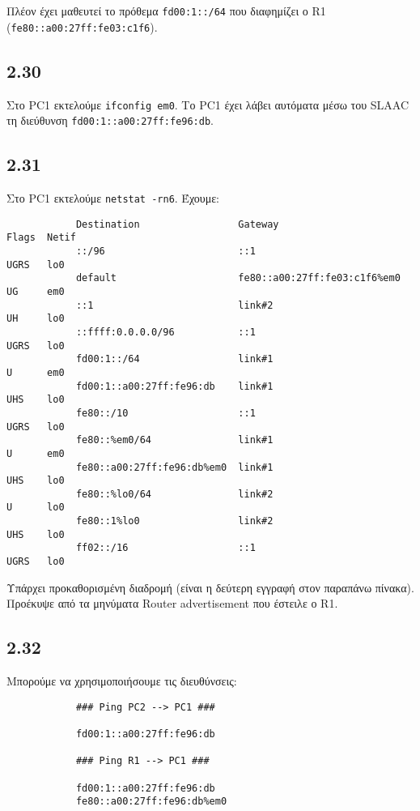 \documentclass[a4paper, 12pt]{article}
\begin{document}
		Πλέον έχει μαθευτεί το πρόθεμα \verb|fd00:1::/64| που διαφημίζει ο R1 (\verb|fe80::a00:27ff:fe03:c1f6|).

	\subsection*{2.30}
		Στο PC1 εκτελούμε \verb|ifconfig em0|. Το PC1 έχει λάβει αυτόματα μέσω του SLAAC τη διεύθυνση \verb|fd00:1::a00:27ff:fe96:db|. 

	\subsection*{2.31}
		Στο PC1 εκτελούμε \verb|netstat -rn6|. Έχουμε:
		
		\begin{verbatim}
			Destination                 Gateway                       Flags  Netif
			::/96                       ::1                           UGRS   lo0
			default                     fe80::a00:27ff:fe03:c1f6%em0  UG     em0
			::1                         link#2                        UH     lo0
			::ffff:0.0.0.0/96           ::1                           UGRS   lo0
			fd00:1::/64                 link#1                        U      em0
			fd00:1::a00:27ff:fe96:db    link#1                        UHS    lo0
			fe80::/10                   ::1                           UGRS   lo0
			fe80::%em0/64               link#1                        U      em0
			fe80::a00:27ff:fe96:db%em0  link#1                        UHS    lo0
			fe80::%lo0/64               link#2                        U      lo0
			fe80::1%lo0                 link#2                        UHS    lo0
			ff02::/16                   ::1                           UGRS   lo0
		\end{verbatim}
		
		Υπάρχει προκαθορισμένη διαδρομή (είναι η δεύτερη εγγραφή στον παραπάνω πίνακα). Προέκυψε από τα μηνύματα Router advertisement που έστειλε ο R1.

	\subsection*{2.32}
		Μπορούμε να χρησιμοποιήσουμε τις διευθύνσεις:
		
		\begin{verbatim}
			### Ping PC2 --> PC1 ###
			
			fd00:1::a00:27ff:fe96:db
			
			### Ping R1 --> PC1 ###
			
			fd00:1::a00:27ff:fe96:db
			fe80::a00:27ff:fe96:db%em0
		\end{verbatim}
		
\end{document}

